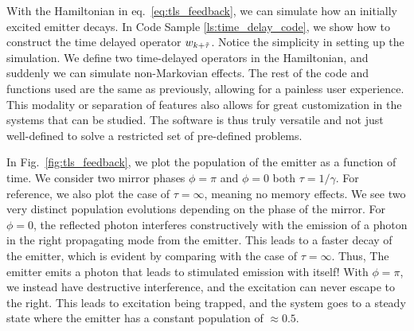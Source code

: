 With the Hamiltonian in eq.~\eqref{eq:tls_feedback}, we can simulate how an initially excited emitter decays. In Code Sample \ref{ls:time_delay_code}, we show how to construct the time delayed operator $w_{k+\Tilde{\tau}}$. Notice the simplicity in setting up the simulation. We define two time-delayed operators in the Hamiltonian, and suddenly we can simulate non-Markovian effects. The rest of the code and functions used are the same as previously, allowing for a painless user experience. This modality or separation of features also allows for great customization in the systems that can be studied. The software is thus truly versatile and not just well-defined to solve a restricted set of pre-defined problems.

In Fig.~\ref{fig:tls_feedback}, we plot the population of the emitter as a function of time. We consider two mirror phases $\phi = \pi$ and $\phi = 0$ both $\tau = 1/\gamma$. For reference, we also plot the case of $\tau = \infty$, meaning no memory effects. We see two very distinct population evolutions depending on the phase of the mirror. For $\phi = 0$, the reflected photon interferes constructively with the emission of a photon in the right propagating mode from the emitter.  This leads to a faster decay of the emitter, which is evident by comparing with the case of $\tau=\infty$. Thus, The emitter emits a photon that leads to stimulated emission with itself! With $\phi = \pi$, we instead have destructive interference, and the excitation can never escape to the right. This leads to excitation being trapped, and the system goes to a steady state where the emitter has a constant population of $\approx 0.5$. 




